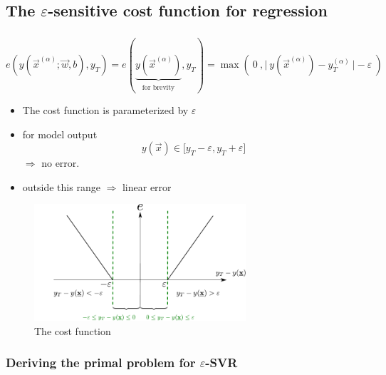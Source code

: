 \subsection{The $\varepsilon$-sensitive cost function for regression}

\begin{frame}\frametitle{\subsecname}

\begin{equation}
e(y(\vec x^{(\alpha)}; \vec w, b), y_{T})
= e(\underbrace{y(\vec x^{(\alpha)})}_{\substack{\text{for brevity}}}, y_{T})
= \max(~0~, \big|~y(\vec x^{(\alpha)}) - y_{T}^{(\alpha)}~\big| - \varepsilon~)
\end{equation}

\begin{itemize}
\item The cost function is parameterized by $\varepsilon${}
\item for model output
\begin{equation}
y(\vec x) \in \lbrack y_{T}-\varepsilon, y_{T}+\varepsilon\rbrack    
\end{equation}    
$\Rightarrow$ no error.
\item outside this range $\Rightarrow$ linear error
\end{itemize}

\begin{figure}[h]
     \centering
	 \includegraphics[width=0.7\textwidth]{img/cost_eps}%
     \caption{The cost function}
	 \label{fig:cost}
\end{figure}
    
\end{frame}

\subsubsection{Deriving the primal problem for $\varepsilon$-SVR}


